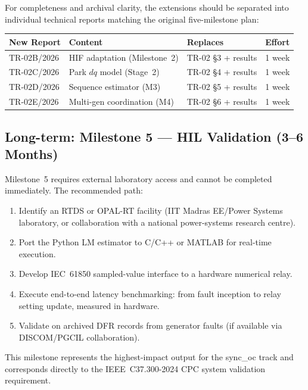 \documentclass[12pt,a4paper]{article}
\begin{document}
For completeness and archival clarity, the extensions should be separated into
individual technical reports matching the original five-milestone plan:

\begin{center}
\begin{tabular}{llll}
\toprule
\textbf{New Report} & \textbf{Content} & \textbf{Replaces} & \textbf{Effort} \\
\midrule
TR-02B/2026 & HIF adaptation (Milestone~2) & TR-02 \S3 + results & 1 week \\
TR-02C/2026 & Park $dq$ model (Stage~2)    & TR-02 \S4 + results & 1 week \\
TR-02D/2026 & Sequence estimator (M3)      & TR-02 \S5 + results & 1 week \\
TR-02E/2026 & Multi-gen coordination (M4)  & TR-02 \S6 + results & 1 week \\
\bottomrule
\end{tabular}
\end{center}

\subsection{Long-term: Milestone 5 — HIL Validation (3--6 Months)}
\label{sec:cor:hil}

Milestone~5 requires external laboratory access and cannot be completed
immediately.  The recommended path:

\begin{enumerate}
  \item Identify an RTDS or OPAL-RT facility (IIT Madras EE/Power Systems
        laboratory, or collaboration with a national power-systems research centre).
  \item Port the Python LM estimator to C/C++ or MATLAB for real-time execution.
  \item Develop IEC~61850 sampled-value interface to a hardware numerical relay.
  \item Execute end-to-end latency benchmarking: from fault inception to
        relay setting update, measured in hardware.
  \item Validate on archived DFR records from generator faults (if available
        via DISCOM/PGCIL collaboration).
\end{enumerate}

This milestone represents the highest-impact output for the sync\_oc track and
corresponds directly to the IEEE~C37.300-2024 CPC system validation requirement.
\end{document}
